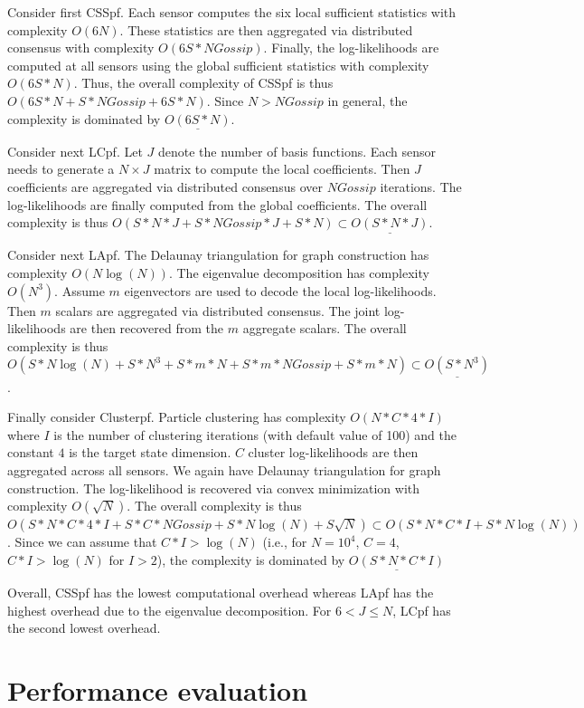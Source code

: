\documentclass[10pt,letterpaper,final]{article}
\begin{document}
Consider first CSSpf. Each sensor computes the six local sufficient statistics with complexity $O(6N)$. These statistics are then aggregated via distributed consensus with complexity $O(6S*NGossip)$. Finally, the log-likelihoods are computed at all sensors using the global sufficient statistics with complexity $O(6S*N)$. Thus, the overall complexity of CSSpf is thus $O(6S*N+S*NGossip+6S*N)$. Since $N>NGossip$ in general, the complexity is dominated by $\underline{O(6S*N)}$. 

Consider next LCpf. Let $J$ denote the number of basis functions. Each sensor needs to generate a $N\times J$ matrix to compute the local coefficients. Then $J$ coefficients are aggregated via distributed consensus over $NGossip$ iterations. The log-likelihoods are finally computed from the global coefficients. The overall complexity is thus $O(S*N*J+S*NGossip*J+S*N) \subset \underline{O(S*N*J)}$. 

Consider next LApf. The Delaunay triangulation for graph construction has complexity $O(N\log(N))$. The eigenvalue decomposition has complexity $O(N^3)$. Assume $m$ eigenvectors are used to decode the local log-likelihoods. Then $m$ scalars are aggregated via distributed consensus. The joint log-likelihoods are then recovered from the $m$ aggregate scalars. The overall complexity is thus $O(S*N\log(N)+S*N^3+S*m*N+S*m*NGossip+S*m*N)\subset \underline{O(S*N^3)}$. 

Finally consider Clusterpf. Particle clustering has complexity $O(N*C*4*I)$ where $I$ is the number of clustering iterations (with default value of 100) and the constant $4$ is the target state dimension. $C$ cluster log-likelihoods are then aggregated across all sensors. We again have Delaunay triangulation for graph construction. The log-likelihood is recovered via convex minimization with complexity $O(\sqrt{N})$. The overall complexity is thus $O(S*N*C*4*I+S*C*NGossip + S*N\log(N)+S\sqrt{N})\subset O(S*N*C*I+S*N\log(N))$. Since we can assume that $C*I > \log(N)$ (i.e., for $N=10^4$, $C=4$, $C*I>\log(N)$ for $I>2$), the complexity is dominated by $\underline{O(S*N*C*I)}$

Overall, CSSpf has the lowest computational overhead whereas LApf has the highest overhead due to the eigenvalue decomposition. For $6<J\leq N$, LCpf has the second lowest overhead. 

\section{Performance evaluation}
\label{sec:evaluation}
\end{document}
